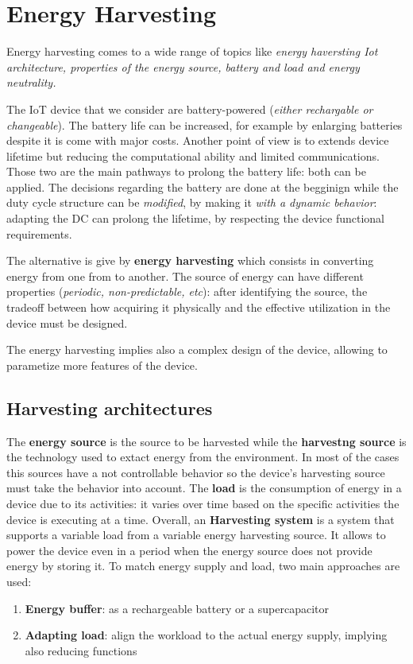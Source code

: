 \documentclass[10pt,a4paper]{report}
\theoremstyle{definition}
\begin{document}
\chapter{Energy Harvesting}\label{sec:energy-harvesting}
Energy harvesting comes to a wide range of topics like \textit{energy haversting Iot architecture, properties of the energy source, battery and load and energy neutrality.}

The IoT device that we consider are battery-powered (\textit{either rechargable or changeable}). The battery life can be increased, for example by enlarging batteries despite it is come with major costs.
Another point of view is to extends device lifetime but reducing the computational ability and limited communications.
Those two are the main pathways to prolong the battery life: both can be applied.
The decisions regarding the battery are done at the begginign while the duty cycle structure can be \textit{modified}, by making it \textit{with a dynamic behavior}: adapting the DC can prolong the lifetime, by respecting the device functional requirements.

The alternative is give by \textbf{energy harvesting} which consists in converting energy from one from to another.  The source of energy can have different properties (\textit{periodic, non-predictable, etc}): after identifying the source, the tradeoff between how acquiring it physically and the effective utilization in the device must be designed.

The energy harvesting implies also a complex design of the device, allowing to parametize more features of the device.

\section{Harvesting architectures}\label{sec:harvesting-architectures}
The \textbf{energy source} is the source to be harvested while the \textbf{harvestng source} is the technology used to extact energy from the environment. In most of the cases this sources have a not controllable behavior so the device's harvesting source must take the behavior into account.
The \textbf{load} is the consumption of energy in a device due to its activities: it varies over time based on the specific activities the device is executing at a time.
Overall, an \textbf{Harvesting system} is a system that supports a variable load from a variable energy harvesting source. It allows to power the device even in a period when the energy source does not provide energy by storing it.
To match energy supply and load, two main approaches are used:
\begin{enumerate}
	\item 
	\textbf{Energy buffer}: as a rechargeable battery or a supercapacitor
	\item 
	\textbf{Adapting load}: align the workload to the actual energy supply, implying also reducing functions
\end{enumerate}
\end{document}
